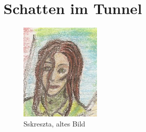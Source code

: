 \documentclass[11pt]{article}
\begin{document}
\section{Schatten im Tunnel}

\begin{figure}[htbp]
\centering
\includegraphics{sskreszta-portrait-alt-klein.png}
\caption{Sskreszta, altes Bild}
\end{figure}
\end{document}
